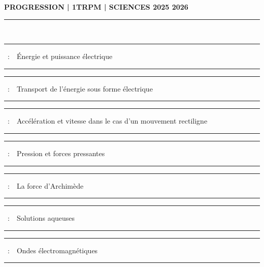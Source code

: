 \documentclass[11pt,a4paper]{article}
\newcounter{numchap}%
\newcommand{\chap}[1]{%
\addtocounter{numchap}{1}%
\textcolor{black}{Chapitre\,\thenumchap\,}\,#1%
}
\newcommand{\chapitre}[1]
{


\hrule
\vspace{5mm}
\large{ \chap~:~~#1 }
\vspace{5mm}
\hrule

\vfill 

}
\begin{document}
\center \LARGE{ \textbf{PROGRESSION | 1TRPM | SCIENCES 2025 2026}}
\\[0,5cm]

\normalsize

\hrule\

\vspace{1cm}

\begin{center}


\chapitre{Énergie et puissance électrique}
\chapitre{Transport de l'énergie sous forme électrique}
\chapitre{Accélération et vitesse dans le cas d'un mouvement rectiligne}
\chapitre{Pression et forces pressantes}
\chapitre{La force d'Archimède}


\chapitre{Solutions aqueuses}
\chapitre{Ondes électromagnétiques}


\end{center}
\end{document}
